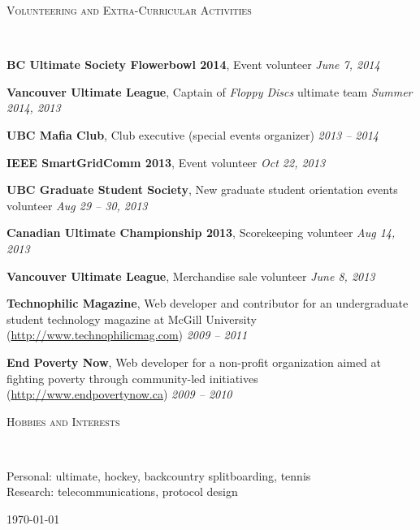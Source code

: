 \documentclass[letterpaper]{article}
\newenvironment{changemargin}[2]{%
  \begin{list}{}{%
    \setlength{\topsep}{0pt}%
    \setlength{\leftmargin}{#1}%
    \setlength{\rightmargin}{#2}%
    \setlength{\listparindent}{\parindent}%
    \setlength{\itemindent}{\parindent}%
    \setlength{\parsep}{\parskip}%
  }%
  \item[]}{\end{list}
}
\newcommand{\lineover}{
  \begin{changemargin}{-0.05in}{-0.05in}
    \vspace*{-8pt}
    \hrulefill \\
    \vspace*{-2pt}
  \end{changemargin}
}
\renewcommand{\section}[1]{
  \begin{changemargin}{-0.5in}{-0.5in}
    \normalsize \scshape{#1}\\
    \lineover
  \end{changemargin}
}
\newenvironment{body} {
  \vspace{2pt}
  \begin{changemargin}{-0.25in}{-0.5in}
    }{
  \end{changemargin}
}
\newcommand{\itemdescription}[3]{
  \textbf{#1}, {#2} \hfill \emph{#3}\\
  \medskip
}
\begin{document}
\section{Volunteering and Extra-Curricular Activities}
\begin{body}
\itemdescription{BC Ultimate Society Flowerbowl 2014}{Event volunteer}{June
7, 2014}
\itemdescription{Vancouver Ultimate League}{Captain of \emph{Floppy Discs}
ultimate team}{Summer 2014, 2013}
\itemdescription{UBC Mafia Club}{Club executive (special events organizer)}{2013
-- 2014}
\itemdescription{IEEE SmartGridComm 2013}{Event volunteer}{Oct 22,
2013}
\itemdescription{UBC Graduate Student Society}{New graduate student orientation
events volunteer}{Aug 29 -- 30, 2013}
\itemdescription{Canadian Ultimate Championship
2013}{Scorekeeping volunteer}{Aug 14, 2013}
\itemdescription{Vancouver Ultimate League}{Merchandise
sale volunteer}{June 8, 2013}
\itemdescription{Technophilic Magazine}{Web developer and contributor for an
undergraduate student technology magazine at McGill University
(\url{http://www.technophilicmag.com})}{2009 -- 2011}
\itemdescription{End Poverty Now}{Web developer for a non-profit organization 
aimed at fighting poverty through community-led initiatives
(\url{http://www.endpovertynow.ca})}{2009 -- 2010}
\end{body}
\medskip

\section{Hobbies and Interests}
\begin{body}
Personal: ultimate, hockey, backcountry splitboarding, tennis \\
Research: telecommunications, protocol design
\end{body}

\vfill \hfill \usdate\today
\end{document}
